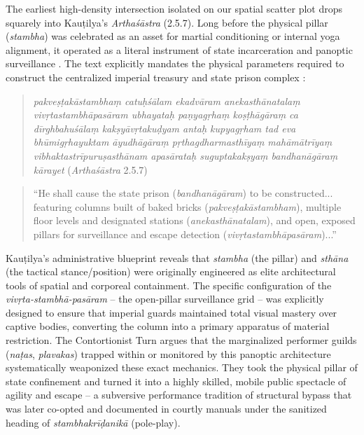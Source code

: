 \documentclass[11pt,twoside,letterpaper]{article}
\begin{document}
The earliest high-density intersection isolated on our spatial scatter plot drops squarely into Kau\d{t}ilya’s \textit{Artha\'s\={a}stra} (2.5.7). Long before the physical pillar (\textit{stambha}) was celebrated as an asset for martial conditioning or internal yoga alignment, it operated as a literal instrument of state incarceration and panoptic surveillance \citep{Kangle1969}. The text explicitly mandates the physical parameters required to construct the centralized imperial treasury and state prison complex \citep{Kangle1969}:
\begin{quote}
\textit{pakve\d{s}\d{t}ak\={a}stambha\d{m} catu\d{h}\'s\={a}lam ekadv\={a}ram anekasth\={a}natala\d{m} viv\d{r}tastambh\={a}pas\={a}ram ubhayata\d{h} pa\d{n}yag\d{r}ha\d{m} ko\d{s}\d{t}h\={a}g\={a}ra\d{m} ca d\={i}rghbahu\'s\={a}la\d{m} kak\d{s}y\={a}v\d{r}taku\d{d}yam anta\d{h} kupyag\d{r}ham tad eva bh\={u}mig\d{r}hayuktam \={a}yudh\={a}g\={a}ra\d{m} p\d{r}thagdharmasth\={i}ya\d{m} mah\={a}m\={a}tr\={i}ya\d{m} vibhaktastr\={i}puru\d{s}asth\={a}nam apas\={a}rata\d{h} suguptakak\d{s}ya\d{m} bandhan\={a}g\={a}ra\d{m} k\={a}rayet} (\textit{Artha\'s\={a}stra} 2.5.7)
\end{quote}
\begin{quote}
\small
``He shall cause the state prison (\textit{bandhan\={a}g\={a}ram}) to be constructed... featuring columns built of baked bricks (\textit{pakve\d{s}\d{t}ak\={a}stambham}), multiple floor levels and designated stations (\textit{anekasth\={a}natalam}), and open, exposed pillars for surveillance and escape detection (\textit{viv\d{r}tastambh\={a}pas\={a}ram})...''
\end{quote}


Kau\d{t}ilya’s administrative blueprint reveals that \textit{stambha} (the pillar) and \textit{sth\={a}na} (the tactical stance/position) were originally engineered as elite architectural tools of spatial and corporeal containment. The specific configuration of the \textit{viv\d{r}ta-stambh\={a}-pas\={a}ram} – the open-pillar surveillance grid – was explicitly designed to ensure that imperial guards maintained total visual mastery over captive bodies, converting the column into a primary apparatus of material restriction. The Contortionist Turn argues that the marginalized performer guilds (\textit{na\d{t}as}, \textit{plavakas}) trapped within or monitored by this panoptic architecture systematically weaponized these exact mechanics. They took the physical pillar of state confinement and turned it into a highly skilled, mobile public spectacle of agility and escape – a subversive performance tradition of structural bypass that was later co-opted and documented in courtly manuals under the sanitized heading of \textit{stambhakr\={i}\d{d}anik\={a}} (pole-play).
\end{document}
